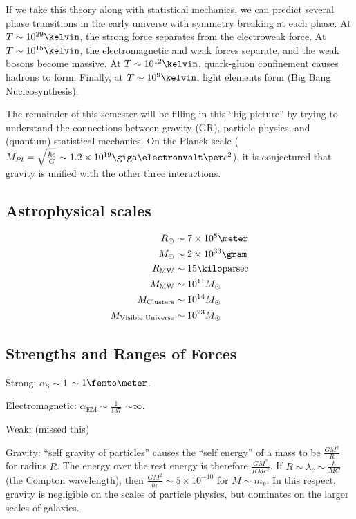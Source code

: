 \documentclass[a4paper,twoside,master.tex]{subfiles}
\begin{document}
If we take this theory along with statistical mechanics, we can predict several phase transitions in the early universe with symmetry breaking at each phase. At $ T \sim 10^{29} \kelvin $, the strong force separates from the electroweak force. At $ T \sim 10^{15} \kelvin $, the electromagnetic and weak forces separate, and the weak bosons become massive. At $ T \sim 10^{12} \kelvin $, quark-gluon confinement causes hadrons to form. Finally, at $ T \sim 10^{9} \kelvin $, light elements form (Big Bang Nucleosynthesis).

The remainder of this semester will be filling in this ``big picture'' by trying to understand the connections between gravity (GR), particle physics, and (quantum) statistical mechanics. On the Planck scale ($ M_{Pl} = \sqrt{\frac{\hbar c}{G}} \sim 1.2 \times 10^{19} \giga\electronvolt\per c^2 $), it is conjectured that gravity is unified with the other three interactions.

\subsection{Astrophysical scales}\label{sub:astrophysical_scales}

\begin{align}
    R_{\odot} &\sim 7 \times 10^{8} \meter\\
    M_{\odot} &\sim 2 \times 10^{33} \gram\\
    R_{\text{MW}} &\sim 15\kilo\text{parsec}\\
    M_{\text{MW}} &\sim 10^{11} M_{\odot}\\
    M_{\text{Clusters}} &\sim 10^{14} M_{\odot}\\
    M_{\text{Visible Universe}} &\sim 10^{23} M_{\odot}
\end{align}

\subsection{Strengths and Ranges of Forces}\label{sub:strengths_and_ranges_of_forces}

Strong: $ \alpha_{\text{S}} \sim 1 $ \textemdash $ \sim 1 \femto\meter $.

Electromagnetic: $ \alpha_{\text{EM}} \sim \frac{1}{137} $ \textemdash $ \sim \infty $.

Weak: (missed this)

Gravity: ``self gravity of particles'' causes the ``self energy'' of a mass to be $ \frac{GM^2}{R} $ for radius $ R $. The energy over the rest energy is therefore $ \frac{GM^2}{RMc^2} $. If $ R \sim \lambda_c \sim \frac{\hbar}{MC} $ (the Compton wavelength), then $ \frac{GM^2}{\hbar c} \sim 5 \times 10^{-40} $ for $ M \sim m_p $. In this respect, gravity is negligible on the scales of particle physics, but dominates on the larger scales of galaxies.
\end{document}
